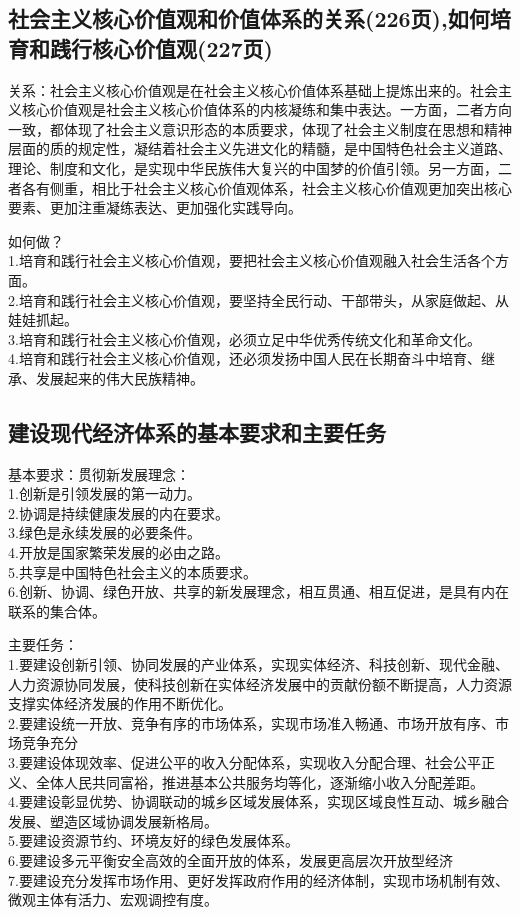 \documentclass[cn,11pt]{elegantbook}
\begin{document}
\subsection{社会主义核心价值观和价值体系的关系(226页),如何培育和践行核心价值观(227页)}
{\large 
{\heiti 关系：}社会主义核心价值观是在社会主义核心价值体系基础上提炼出来的。社会主义核心价值观是社会主义核心价值体系的内核凝练和集中表达。{\heiti 一方面}，二者方向一致，都体现了社会主义意识形态的本质要求，体现了社会主义制度在思想和精神层面的质的规定性，凝结着社会主义先进文化的精髓，是中国特色社会主义道路、理论、制度和文化，是实现中华民族伟大复兴的中国梦的价值引领。{\heiti 另一方面}，二者各有侧重，相比于社会主义核心价值观体系，社会主义核心价值观更加突出核心要素、更加注重凝练表达、更加强化实践导向。

{\heiti 如何做？}\\
1.培育和践行社会主义核心价值观，要把社会主义核心价值观融入社会生活各个方面。\\2.培育和践行社会主义核心价值观，要坚持全民行动、干部带头，从家庭做起、从娃娃抓起。\\3.培育和践行社会主义核心价值观，必须立足中华优秀传统文化和革命文化。\\4.培育和践行社会主义核心价值观，还必须发扬中国人民在长期奋斗中培育、继承、发展起来的伟大民族精神。


}
\subsection{建设现代经济体系的基本要求和主要任务}
{\large 
{\heiti 基本要求：}贯彻新发展理念：\\
1.创新是引领发展的第一动力。\\
2.协调是持续健康发展的内在要求。\\
3.绿色是永续发展的必要条件。\\
4.开放是国家繁荣发展的必由之路。\\
5.共享是中国特色社会主义的本质要求。\\
6.创新、协调、绿色开放、共享的新发展理念，相互贯通、相互促进，是具有内在联系的集合体。

{\heiti 主要任务：}\\
1.要建设创新引领、协同发展的产业体系，实现实体经济、科技创新、现代金融、人力资源协同发展，使科技创新在实体经济发展中的贡献份额不断提高，人力资源支撑实体经济发展的作用不断优化。\\
2.要建设统一开放、竞争有序的市场体系，实现市场准入畅通、市场开放有序、市场竞争充分\\
3.要建设体现效率、促进公平的收入分配体系，实现收入分配合理、社会公平正义、全体人民共同富裕，推进基本公共服务均等化，逐渐缩小收入分配差距。\\
4.要建设彰显优势、协调联动的城乡区域发展体系，实现区域良性互动、城乡融合发展、塑造区域协调发展新格局。\\
5.要建设资源节约、环境友好的绿色发展体系。\\
6.要建设多元平衡安全高效的全面开放的体系，发展更高层次开放型经济\\
7.要建设充分发挥市场作用、更好发挥政府作用的经济体制，实现市场机制有效、微观主体有活力、宏观调控有度。
}
\end{document}
